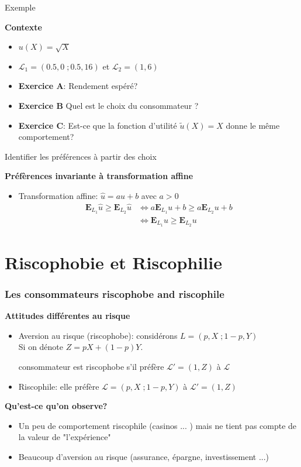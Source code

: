 \documentclass[handout]{beamer}
\newenvironment{iPar}[1]{\textbf{#1} \begin{itemize}}{\end{itemize}}
\newcommand{\esp}{\mathbf{E}} \newcommand{\ul}[1]{\underline{#1}}
\newcommand{\wh}{\widehat}
\newcommand{\mdp}{\medskip \pause}
\begin{document}
\begin{frame}{Exemple}

\begin{iPar}{Contexte} \item $u(X) = \sqrt{X}$ \item $\mathcal L_1 =
(0.5,0\;; 0.5,16)$ et $\mathcal L_2 = (1,6)$ \item \textbf{Exercice A}: Rendement espéré? \item
\textbf{Exercice B} Quel est le choix du consommateur ?  \item \textbf{Exercice C}: Est-ce que la fonction d'utilité $\tilde u(X) = X$ donne le même comportement?\end{iPar}

\end{frame}

\begin{frame}{Identifier les préférences à partir des choix}

\begin{iPar}{Préfèrences invariante à transformation affine}
\item Transformation affine: $\wh u = a u +b$ avec $a>0$
\begin{align*}
\esp_{L_1} \wh u \geq \esp_{L_2} \wh u & \iff  a\esp_{L_1} u + b \geq a\esp_{L_2} u + b \\ & \iff 
 \esp_{L_1} u  \geq \esp_{L_2} u
\end{align*}\mdp

\end{iPar}

\end{frame}

\section{Riscophobie et Riscophilie}

\begin{frame}\frametitle{Les consommateurs riscophobe and riscophile}
\begin{iPar}{Attitudes différentes au risque} \item Aversion au risque (riscophobe): considérons $L = (p, X\;; 1-p,Y)$\\
Si on dénote $Z = p X + (1-p)Y $. \mdp

consommateur est riscophobe s'il préfère $\mathcal L' = (1,Z)$ à $\mathcal L$  \mdp \item Riscophile: elle préfère $ \mathcal L = (p, X\;; 1-p,Y) $ à  $\mathcal L' =
(1,Z)$ \end{iPar}\mdp

\begin{iPar}{Qu'est-ce qu'on observe?} \item Un peu de comportement riscophile (casinos
... ) mais ne tient pas compte de la valeur de "l'expérience" \item  Beaucoup d'aversion au risque (assurance, épargne, investissement ...) \end{iPar} \end{frame}
\end{document}
